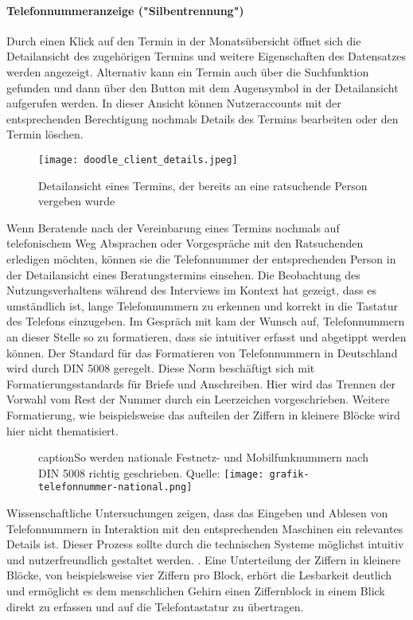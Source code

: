 \paragraph{Telefonnummeranzeige ("Silbentrennung")}

Durch einen Klick auf den Termin in der Monatsübersicht öffnet sich die
Detailansicht des zugehörigen Termins und weitere Eigenschaften des Datensatzes
werden angezeigt. Alternativ kann ein Termin auch über die Suchfunktion
gefunden und dann über den Button mit dem Augensymbol in der Detailansicht
aufgerufen werden. In dieser Ansicht können Nutzeraccounts mit der
entsprechenden Berechtigung nochmals Details des Termins bearbeiten oder den
Termin löschen.

\begin{figure}[h]
    \caption{Detailansicht eines Termins, der bereits an eine ratsuchende Person vergeben wurde}
    \centering
    \texttt{[image: doodle\_client\_details.jpeg]}
\end{figure}

Wenn Beratende nach der Vereinbarung eines Termins nochmals auf telefonischem
Weg Absprachen oder Vorgespräche mit den Ratsuchenden erledigen möchten, können
sie die Telefonnummer der entsprechenden Person in der Detailansicht eines
Beratungstermins einsehen. Die Beobachtung des Nutzungsverhaltens während des
Interviews im Kontext hat gezeigt, dass es umständlich ist, lange
Telefonnummern zu erkennen und korrekt in die Tastatur des Telefons einzugeben.
Im Gespräch mit \ipName kam der Wunsch auf, Telefonnummern an dieser Stelle so
zu formatieren, dass sie intuitiver erfasst und abgetippt werden können. Der
Standard für das Formatieren von Telefonnummern in Deutschland wird durch DIN
5008 geregelt. Diese Norm beschäftigt sich mit Formatierungsstandards für
Briefe und Anschreiben. Hier wird das Trennen der Vorwahl vom Rest der Nummer
durch ein Leerzeichen vorgeschrieben. Weitere Formatierung, wie beispielsweise
das aufteilen der Ziffern in kleinere Blöcke wird hier nicht thematisiert.
\cite{din5008}

\begin{figure}[h]
    caption{So werden nationale Festnetz- und Mobilfunknummern nach DIN 5008 richtig geschrieben. Quelle: \cite{phoneFormatBlog}}
    \centering
    \texttt{[image: grafik-telefonnummer-national.png]}
\end{figure}

Wissenschaftliche Untersuchungen zeigen, dass das Eingeben und Ablesen von
Telefonnummern in Interaktion mit den entsprechenden Maschinen ein relevantes
Details ist. Dieser Prozess sollte durch die technischen Systeme möglichst
intuitiv und nutzerfreundlich gestaltet werden. \cite{humCompPhoneNumbers}.
Eine Unterteilung der Ziffern in kleinere Blöcke, von beispielsweise vier
Ziffern pro Block, erhört die Lesbarkeit deutlich und ermöglicht es dem
menschlichen Gehirn einen Ziffernblock in einem Blick direkt zu erfassen und
auf die Telefontastatur zu übertragen. \cite{phoneFormatBlog}
\cite{numberRecognition} \cite{numberRepres}

